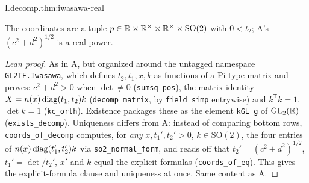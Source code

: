 \begin{theorem}
\end{theorem}
\begin{tfformal}{I.decomp.thm:iwasawa-real}
\begin{tffidelity}
The coordinates are a tuple $p\in\mathbb{R}\times\mathbb{R}^\times\times\mathbb{R}^\times\times\mathrm{SO}(2)$ with $0<t_2$; A's $(c^2+d^2)^{1/2}$ is a real power.
\end{tffidelity}
\end{tfformal}
\begin{proof}[Lean proof]
As in A, but organized around the untagged namespace \texttt{GL2TF.Iwasawa}, which defines $t_2,t_1,x,k$ as functions of a Pi-type matrix and proves: $c^2+d^2>0$ when $\det\neq0$ (\texttt{sumsq\_pos}), the matrix identity $X=n(x)\operatorname{diag}(t_1,t_2)k$ (\texttt{decomp\_matrix}, by \texttt{field\_simp} entrywise) and $k^{\mathsf T}k=1$, $\det k=1$ (\texttt{kc\_orth}). Existence packages these as the element \texttt{kGL g} of $\mathrm{GL}_2(\mathbb{R})$ (\texttt{exists\_decomp}). Uniqueness differs from A: instead of comparing bottom rows, \texttt{coords\_of\_decomp} computes, for \emph{any} $x,t_1',t_2'>0$, $k\in\mathrm{SO}(2)$, the four entries of $n(x)\operatorname{diag}(t_1',t_2')k$ via \texttt{so2\_normal\_form}, and reads off that $t_2'=(c^2+d^2)^{1/2}$, $t_1'=\det/t_2'$, $x'$ and $k$ equal the explicit formulas (\texttt{coords\_of\_eq}). This gives the explicit-formula clause and uniqueness at once. Same content as A.
\end{proof}


